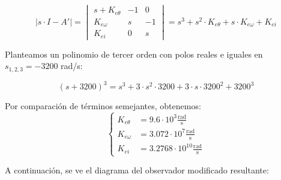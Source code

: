 \documentclass{article}
\begin{document}
\begin{equation}
|s \cdot I - A'| = \begin{vmatrix}
    s + K_{e\theta} & -1 & 0 \\
    K_{e\omega} & s & -1 \\
    K_{ei} & 0 & s
\end{vmatrix}
= s^3 + s^2 \cdot K_{e\theta} + s \cdot K_{e\omega} + K_{ei}
\end{equation}

Planteamos un polinomio de tercer orden con polos reales e iguales en $s_{1,2,3} = -3200$ rad/s:

\begin{equation}
(s + 3200)^3 = s^3 + 3 \cdot s^2 \cdot 3200 + 3 \cdot s \cdot 3200^2 + 3200^3 
\end{equation}

Por comparaci\'on de t\'erminos semejantes, obtenemos:
\begin{equation}
\left\{
\begin{aligned}
K_{e\theta} &= 9.6 \cdot 10^3 \frac{\text{rad}}{\text{s}} \\ 
K_{e\omega} &= 3.072 \cdot 10^7 \frac{\text{rad}}{\text{s}} \\
K_{ei} &= 3.2768 \cdot 10^{10} \frac{\text{rad}}{\text{s}}
\end{aligned}
\right.
\end{equation}

A continuaci\'on, se ve el diagrama del observador modificado resultante:
\end{document}

